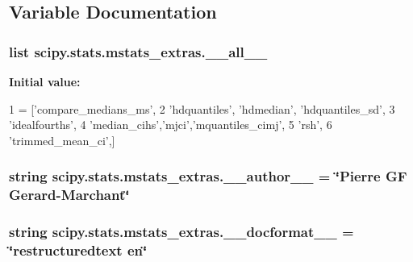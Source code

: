 \subsection{Variable Documentation}
\hypertarget{namespacescipy_1_1stats_1_1mstats__extras_a187214ff603c513e6dbdae69d068d12d}{}
\subsubsection[{\+\_\+\+\_\+all\+\_\+\+\_\+}]{\setlength{\rightskip}{0pt plus 5cm}list scipy.\+stats.\+mstats\+\_\+extras.\+\_\+\+\_\+all\+\_\+\+\_\+}\label{namespacescipy_1_1stats_1_1mstats__extras_a187214ff603c513e6dbdae69d068d12d}
{\bfseries Initial value\+:}
\begin{DoxyCode}
1 = [\textcolor{stringliteral}{'compare\_medians\_ms'},
2            \textcolor{stringliteral}{'hdquantiles'}, \textcolor{stringliteral}{'hdmedian'}, \textcolor{stringliteral}{'hdquantiles\_sd'},
3            \textcolor{stringliteral}{'idealfourths'},
4            \textcolor{stringliteral}{'median\_cihs'},\textcolor{stringliteral}{'mjci'},\textcolor{stringliteral}{'mquantiles\_cimj'},
5            \textcolor{stringliteral}{'rsh'},
6            \textcolor{stringliteral}{'trimmed\_mean\_ci'},]
\end{DoxyCode}
\hypertarget{namespacescipy_1_1stats_1_1mstats__extras_a12ff97d453c95f3722912cc52d0645cf}{}
\subsubsection[{\+\_\+\+\_\+author\+\_\+\+\_\+}]{\setlength{\rightskip}{0pt plus 5cm}string scipy.\+stats.\+mstats\+\_\+extras.\+\_\+\+\_\+author\+\_\+\+\_\+ = \char`\"{}Pierre G\+F Gerard-\/Marchant\char`\"{}}\label{namespacescipy_1_1stats_1_1mstats__extras_a12ff97d453c95f3722912cc52d0645cf}
\hypertarget{namespacescipy_1_1stats_1_1mstats__extras_a02f09f8e218106feab0118a5edef61cb}{}
\subsubsection[{\+\_\+\+\_\+docformat\+\_\+\+\_\+}]{\setlength{\rightskip}{0pt plus 5cm}string scipy.\+stats.\+mstats\+\_\+extras.\+\_\+\+\_\+docformat\+\_\+\+\_\+ = \char`\"{}restructuredtext en\char`\"{}}\label{namespacescipy_1_1stats_1_1mstats__extras_a02f09f8e218106feab0118a5edef61cb}
